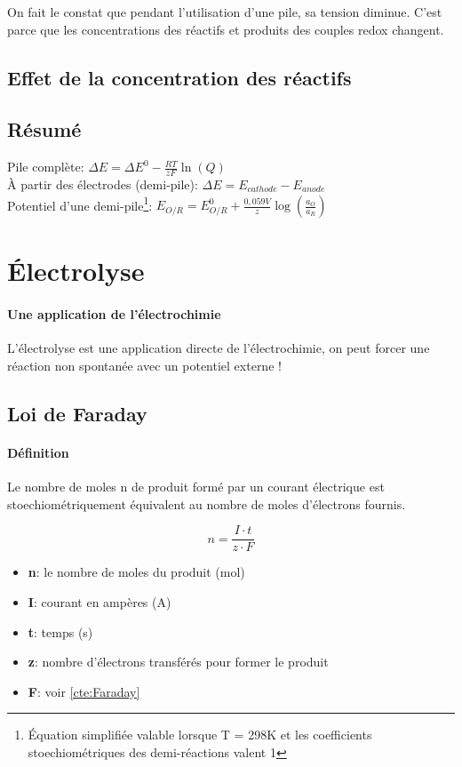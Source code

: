 \documentclass[10pt,a4paper]{book}
\begin{document}
On fait le constat que pendant l’utilisation d’une pile, sa tension diminue. C’est parce que les concentrations des réactifs et produits des couples redox changent.

\subsection{Effet de la concentration des réactifs}
\subsection{Résumé}

Pile complète: \(\Delta E = \Delta E^0- \frac{RT}{zF}\ln(Q)\) \\
À partir des électrodes (demi-pile): \(\Delta E = E_{cathode} - E_{anode}\) \\
Potentiel d’une demi-pile\footnote{Équation simplifiée valable lorsque T = 298K et les coefficients stoechiométriques des demi-réactions valent 1}: \(E_{O/R} = E_{O/R}^0 + \frac{0,059V}{z} \log\left(\frac{a_O}{a_R}\right)\)

\section{Électrolyse}

\paragraph{Une application de l'électrochimie} L'électrolyse est une application directe de l'électrochimie, on peut forcer une réaction non spontanée avec un potentiel externe !

\subsection{Loi de Faraday}

\paragraph{Définition} Le nombre de moles n de produit formé par un courant électrique est stoechiométriquement équivalent au nombre de moles d’électrons fournis.

\begin{displaymath}
n = \frac{I \cdot t}{z \cdot F}
\end{displaymath}
\begin{itemize}
\item \textbf{n}: le nombre de moles du produit (mol)
\item \textbf{I}: courant en ampères (A)
\item \textbf{t}: temps (s)
\item \textbf{z}: nombre d'électrons transférés pour former le produit
\item \textbf{F}: voir \ref{cte:Faraday}
\end{itemize}
\end{document}
